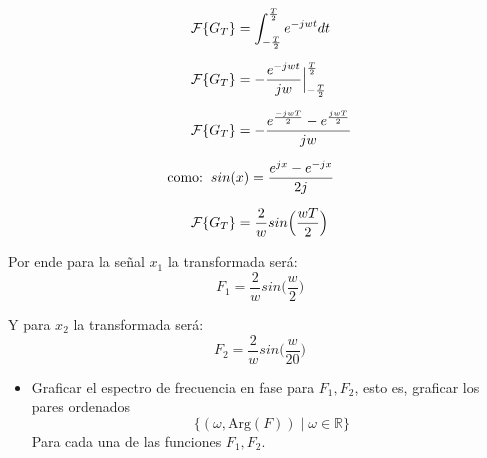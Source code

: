\documentclass[12pt,a4paper]{report}
\begin{document}
\begin{enumerate}[label=\alph*),left=0pt]
    $$
    \begin{aligned}
      \mathcal{F}\{G_T\} &= \int_{-\frac{T}{2}}^{\frac{T}{2}}e^{-jwt}dt \\[6pt]
      \mathcal{F}\{G_T\} &= -\frac{e^{-jwt}}{jw}\Big|^{\frac{T}{2}}_{-\frac{T}{2}} \\[6pt]
      \mathcal{F}\{G_T\} &= -\frac{e^{\frac{-jwT}{2}}-e^{\frac{jwT}{2}}}{jw}\\[6pt]
      \text{como:} \hspace{2mm} sin(&x)=\frac{e^{jx}-e^{-jx}}{2j}\\[6pt]
      \mathcal{F}\{G_T\} &= \frac{2}{w}sin\Big(\frac{wT}{2}\Big)
    \end{aligned}
    $$

    Por ende para la señal $x_1$ la transformada será:
    $$F_1= \frac{2}{w}sin\Big(\frac{w}{2}\Big)$$

    Y para $x_2$ la transformada será:
    $$F_2= \frac{2}{w}sin\Big(\frac{w}{20}\Big)$$

    \begin {itemize}[left=0pt]

      \item Graficar el espectro de frecuencia en fase para $F_1, F_2$, esto es, graficar los pares ordenados
        $$\{(\omega, \text{Arg}(F)) \mid \omega \in \mathbb{R}\}$$
        Para cada una de las funciones $F_1, F_2$.\newline


\end{itemize}
\end{enumerate}
\end{document}
